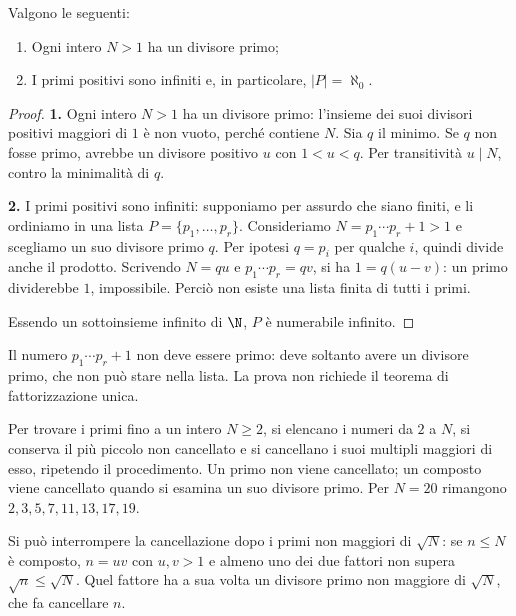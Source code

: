 \begin{teorema}
Valgono le seguenti:
\begin{enumerate}
    \item Ogni intero $N>1$ ha un divisore primo;
    \item I primi positivi sono infiniti e, in particolare, $|P|=\aleph_0$.
\end{enumerate}
\end{teorema}
\begin{proof}
\textbf{1.} Ogni intero $N>1$ ha un divisore primo: l'insieme dei suoi divisori positivi maggiori di $1$ è non vuoto, perché contiene $N$. Sia $q$ il minimo. Se $q$ non fosse primo, avrebbe un divisore positivo $u$ con $1<u<q$. Per transitività $u\mid N$, contro la minimalità di $q$.

\textbf{2.} I primi positivi sono infiniti: supponiamo per assurdo che siano finiti, e li ordiniamo in una lista $P=\{p_1,\ldots,p_r\}$. Consideriamo $N=p_1\cdots p_r+1>1$ e scegliamo un suo divisore primo $q$. Per ipotesi $q=p_i$ per qualche $i$, quindi divide anche il prodotto. Scrivendo $N=qu$ e $p_1\cdots p_r=qv$, si ha $1=q(u-v)$: un primo dividerebbe $1$, impossibile. Perciò non esiste una lista finita di tutti i primi.

Essendo un sottoinsieme infinito di $\N$, $P$ è numerabile infinito.
\end{proof}

\begin{osservazione}
Il numero $p_1\cdots p_r+1$ non deve essere primo: deve soltanto avere un divisore primo, che non può stare nella lista. La prova non richiede il teorema di fattorizzazione unica.
\end{osservazione}

\begin{esempio}
Per trovare i primi fino a un intero $N\ge2$, si elencano i numeri da $2$ a $N$, si conserva il più piccolo non cancellato e si cancellano i suoi multipli maggiori di esso, ripetendo il procedimento. Un primo non viene cancellato; un composto viene cancellato quando si esamina un suo divisore primo. Per $N=20$ rimangono $2,3,5,7,11,13,17,19$.

Si può interrompere la cancellazione dopo i primi non maggiori di $\sqrt N$: se $n\le N$ è composto, $n=uv$ con $u,v>1$ e almeno uno dei due fattori non supera $\sqrt n\le\sqrt N$. Quel fattore ha a sua volta un divisore primo non maggiore di $\sqrt N$, che fa cancellare $n$.
\end{esempio}

